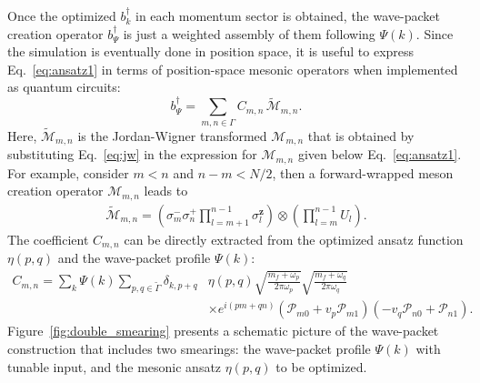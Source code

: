 \documentclass[a4paper,onecolumn,11pt,accepted=2024-10-11]{quantumarticle}
\begin{document}
Once the optimized $b_k^\dagger$ in each momentum sector is obtained, the wave-packet creation operator $b_\Psi^\dagger$ is just a weighted assembly of them following $\Psi(k)$. Since the simulation is eventually done in position space, it is useful to express Eq.~\eqref{eq:ansatz1} in terms of position-space mesonic operators when implemented as quantum circuits:
\begin{equation}
    b_\Psi^\dagger = \sum_{m,n  \in \Gamma} C_{m,n} \, \widetilde{\mathcal{M}}_{m,n}.
    \label{eq:ansatz4}
\end{equation}
Here, $\widetilde{\mathcal{M}}_{m,n}$ is the Jordan-Wigner transformed $\mathcal{M}_{m,n}$ that is obtained by substituting Eq.~\eqref{eq:jw} in the expression for $\mathcal{M}_{m,n}$ given below Eq.~\eqref{eq:ansatz1}. For example, consider $m<n$ and $n-m < N/2$, then a forward-wrapped meson creation operator $\mathcal{M}_{m,n}$ leads to 
%
\begin{align}
\widetilde{\mathcal{M}}_{m,n} = \left( \sigma_m^- \sigma_n^+\prod_{l=m+1}^{n-1}\sigma_l^{\textbf{z}}  \right) \otimes \left(\prod_{l=m}^{n-1} U_l\right).
\label{eq:M-tilde}
\end{align}
%
The coefficient $C_{m,n}$ can be directly extracted from the optimized ansatz function $\eta(p,q)$ and the wave-packet profile $\Psi(k)$:
%
\begin{align}
C_{m,n}=\sum_k \Psi(k)\sum_{p,q \in \widetilde{\Gamma}} \delta_{k, p+q} &\eta(p, q)
\sqrt{\frac{m_f+\omega_p}{2\pi\omega_p}} \sqrt{\frac{m_f+\omega_q}{2\pi\omega_q}}\nonumber\\
&\times {e^{i(pm+qn)}}\left(\mathcal{P}_{m0}+v_p\mathcal{P}_{m1}\right) \left(-v_q\mathcal{P}_{n0}+\mathcal{P}_{n1}\right).
\label{eq:cmn-def}
\end{align}
%
Figure~\ref{fig:double_smearing} presents a schematic picture of the wave-packet construction that includes two smearings: the wave-packet profile $\Psi(k)$ with tunable input, and the mesonic ansatz $\eta(p,q)$ to be optimized.
\end{document}
